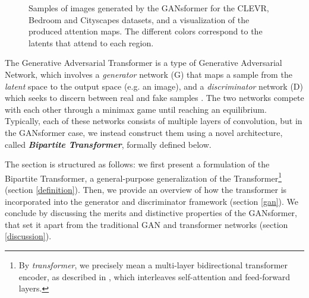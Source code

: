 \documentclass{article}
\begin{document}
\begin{figure*}[t]
\centering
{}
\hfill
{}
\hfill
{}
\hfill
{}
\hfill
{}
\hfill
{}
\vspace*{-10pt}
\centering
{}
\hfill
{}
\hfill
{}
\hfill
{}
\hfill
{}
\hfill
{}
\vspace*{-4pt}
\caption{Samples of images generated by the GANsformer for the CLEVR, Bedroom and Cityscapes datasets, and a visualization of the produced attention maps. The different colors correspond to the latents that attend to each region.}
\label{imgs}
\vspace*{-8pt}
\end{figure*} 

The Generative Adversarial Transformer is a type of Generative Adversarial Network, which involves a \textit{generator} network (G) that maps a sample from the \textit{latent} space to the output space (e.g. an image), and a \textit{discriminator} network (D) which seeks to discern between real and fake samples \citep{gan}. The two networks compete with each other through a minimax game until reaching an equilibrium. Typically, each of these networks consists of multiple layers of convolution, but in the GANsformer case, we instead construct them using a novel architecture, called 
\textbf{\textit{Bipartite Transformer}}, formally defined below. 

The section is structured as follows: we first present a formulation of the Bipartite Transformer, a general-purpose generalization of the Transformer\footnote{By \textit{transformer}, we precisely mean a multi-layer bidirectional transformer encoder, as described in \citep{bert}, which interleaves self-attention and feed-forward layers.} (section \ref{definition}). Then, we provide an overview of how the transformer is incorporated into the generator and discriminator framework (section \ref{gan}). We conclude by discussing the merits and distinctive properties of the GANsformer, that set it apart from the traditional GAN and transformer networks (section \ref{discussion}).
\end{document}

